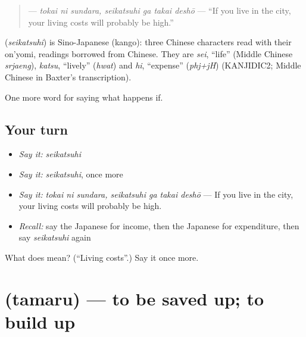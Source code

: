 \begin{quote}
\textbf{  } — \emph{tokai ni sundara, seikatsuhi ga takai deshō} — \textquotedblleft{}If you live in the city, your living costs will probably be high.\textquotedblright{}
\end{quote}

\begin{cousinweb}
\textbf{} (\emph{seikatsuhi}) is Sino-Japanese (kango): three Chinese characters read with their on'yomi, readings borrowed from Chinese. They are \emph{sei}, \textquotedblleft{}life\textquotedblright{} (Middle Chinese \emph{srjaeng}), \emph{katsu}, \textquotedblleft{}lively\textquotedblright{} (\emph{hwat}) and \emph{hi}, \textquotedblleft{}expense\textquotedblright{} (\emph{phj+jH}) (KANJIDIC2; Middle Chinese in Baxter's transcription).
\end{cousinweb}

\begin{grammarlens}[title={What you've built}]
One more word for saying what happens if.
\end{grammarlens}

\subsection*{Your turn}
\begin{itemize}
\raggedright
  \item \emph{Say it:} \emph{seikatsuhi}
  \item \emph{Say it:} \emph{seikatsuhi}, once more
  \item \emph{Say it:} \emph{tokai ni sundara, seikatsuhi ga takai deshō} — If you live in the city, your living costs will probably be high.
  \item \emph{Recall:} say the Japanese for income, then the Japanese for expenditure, then say \emph{seikatsuhi} again
\end{itemize}

\begin{tcolorbox}[breakable,colback=teal!4,colframe=teal!35!black,title={Before you move on}]
What does  mean? (\textquotedblleft{}Living costs\textquotedblright{}.) Say it once more.
\end{tcolorbox}
\section[\texorpdfstring{\ja{たまる} (tamaru)}{たまる (tamaru)}]{ (tamaru) — to be saved up; to build up}

